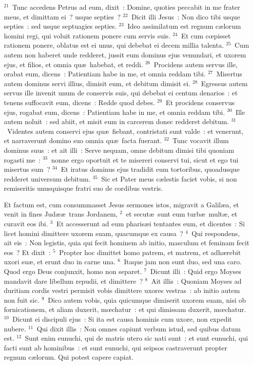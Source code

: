 ${}^{21}$~Tunc accedens Petrus ad eum, dixit~: Domine, quoties peccabit in me frater meus, et dimittam ei~? usque septies~?
${}^{22}$~Dicit illi Jesus~: Non dico tibi usque septies~: sed usque septuagies septies.
${}^{23}$~Ideo assimilatum est regnum c\ae lorum homini regi, qui voluit rationem ponere cum servis suis.
${}^{24}$~Et cum cœpisset rationem ponere, oblatus est ei unus, qui debebat ei decem millia talenta.
${}^{25}$~Cum autem non haberet unde redderet, jussit eum dominus ejus venundari, et uxorem ejus, et filios, et omnia qu\ae\ habebat, et reddi.
${}^{26}$~Procidens autem servus ille, orabat eum, dicens~: Patientiam habe in me, et omnia reddam tibi.
${}^{27}$~Misertus autem dominus servi illius, dimisit eum, et debitum dimisit ei.
${}^{28}$~Egressus autem servus ille invenit unum de conservis suis, qui debebat ei centum denarios~: et tenens suffocavit eum, dicens~: Redde quod debes.
${}^{29}$~Et procidens conservus ejus, rogabat eum, dicens~: Patientiam habe in me, et omnia reddam tibi.
${}^{30}$~Ille autem noluit~: sed abiit, et misit eum in carcerem donec redderet debitum.
${}^{31}$~Videntes autem conservi ejus qu\ae\ fiebant, contristati sunt valde~: et venerunt, et narraverunt domino suo omnia qu\ae\ facta fuerant.
${}^{32}$~Tunc vocavit illum dominus suus~: et ait illi~: Serve nequam, omne debitum dimisi tibi quoniam rogasti me~:
${}^{33}$~nonne ergo oportuit et te misereri conservi tui, sicut et ego tui misertus sum~?
${}^{34}$~Et iratus dominus ejus tradidit eum tortoribus, quoadusque redderet universum debitum.
${}^{35}$~Sic et Pater meus c\ae lestis faciet vobis, si non remiseritis unusquisque fratri suo de cordibus vestris.

\lettrine[lines=10,image=true,loversize=0.05,lraise=-0.03]{E}{}t factum est, cum consummasset Jesus sermones istos, migravit a Galil\ae a, et venit in fines Jud\ae \ae\ trans Jordanem,
${}^{2}$~et secut\ae\ sunt eum turb\ae\ mult\ae , et curavit eos ibi.
${}^{3}$~Et accesserunt ad eum pharis\ae i tentantes eum, et dicentes~: Si licet homini dimittere uxorem suam, quacumque ex causa~?
${}^{4}$~Qui respondens, ait eis~: Non legistis, quia qui fecit hominem ab initio, masculum et feminam fecit eos~? Et dixit~:
${}^{5}$~Propter hoc dimittet homo patrem, et matrem, et adh\ae rebit uxori su\ae , et erunt duo in carne una.
${}^{6}$~Itaque jam non sunt duo, sed una caro. Quod ergo Deus conjunxit, homo non separet.
${}^{7}$~Dicunt illi~: Quid ergo Moyses mandavit dare libellum repudii, et dimittere~?
${}^{8}$~Ait illis~: Quoniam Moyses ad duritiam cordis vestri permisit vobis dimittere uxores vestras~: ab initio autem non fuit sic.
${}^{9}$~Dico autem vobis, quia quicumque dimiserit uxorem suam, nisi ob fornicationem, et aliam duxerit, mœchatur~: et qui dimissam duxerit, mœchatur.
${}^{10}$~Dicunt ei discipuli ejus~: Si ita est causa hominis cum uxore, non expedit nubere.
${}^{11}$~Qui dixit illis~: Non omnes capiunt verbum istud, sed quibus datum est.
${}^{12}$~Sunt enim eunuchi, qui de matris utero sic nati sunt~: et sunt eunuchi, qui facti sunt ab hominibus~: et sunt eunuchi, qui seipsos castraverunt propter regnum c\ae lorum. Qui potest capere capiat.


